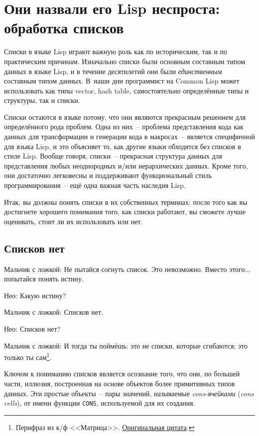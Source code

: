 \chapter{Они назвали его Lisp неспроста: обработка списков}
\label{ch:12}

\thispagestyle{empty}

Списки в языке Lisp играют важную роль как по историческим, так и по практическим
причинам. Изначально списки были основным составным типом данных в языке Lisp, и в течение
десятилетий они были \textit{единственным} составным типом данных. В~наши дни программист на
Common Lisp может использовать как типы vector, hash table, самостоятельно определённые
типы и структуры, так и списки.

Списки остаются в языке потому, что они являются прекрасным решением для определённого
рода проблем. Одна из них~-- проблема представления кода как данных для трансформации и
генерации кода в макросах~-- является специфичной для языка Lisp, и это объясняет то, как
другие языки обходятся без списков в стиле Lisp. Вообще говоря, списки~-- прекрасная
структура данных для представления любых неоднородных и/или иерархических данных. Кроме
того, они достаточно легковесны и поддерживают функциональный стиль программирования~-- ещё
одна важная часть наследия Lisp.

Итак, вы должны понять списки в их собственных терминах; после того как вы достигнете
хорошего понимания того, как списки работают, вы сможете лучше оценивать, стоит ли их
использовать или нет.

\section{Списков нет}

Мальчик с ложкой: Не пытайся согнуть список. Это невозможно. Вместо этого... попытайся
понять истину.

Нео: Какую истину?

Мальчик с ложкой: Списков нет.

Нео: Списков нет?

Мальчик с ложкой: И тогда ты поймёшь: это не списки, которые сгибаются; это только ты
сам\footnote{Перифраз из к/ф <<Матрица>>.
  \href{http://us.imdb.com/Quotes?0133093}{Оригинальная цитата}.}.

Ключом к пониманию списков является осознание того, что они, по большей части, иллюзия,
построенная на основе объектов более примитивных типов данных. Эти простые объекты~-- пары
значений, называемые \textit{cons-ячейками} (\textit{cons cells}), от имени функции
\lstinline{CONS}, используемой для их создания.

